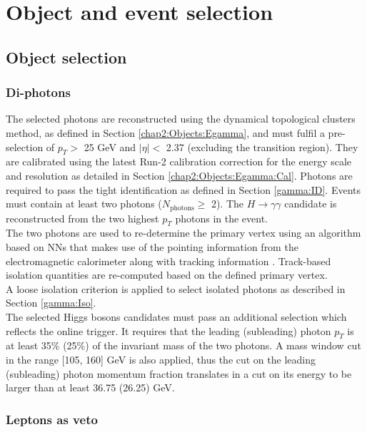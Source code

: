 \section{Object and event selection}
\label{HHyybb:ObjEvt}

\subsection{Object selection}
\label{HHyybb:ObjEvt:Obj}

\subsubsection{Di-photons}
\label{HHyybb:ObjEvt:Obj:gamma}
The selected photons are reconstructed using the dynamical topological clusters method, as defined in Section \ref{chap2:Objects:Egamma}, and must fulfil a pre-selection of $p_T > $ 25 GeV and $|\eta| < $ 2.37 (excluding the transition region). They are calibrated using the latest Run-2 calibration correction for the energy scale and resolution as detailed in Section \ref{chap2:Objects:Egamma:Cal}. Photons are required to pass the tight identification as defined in Section \ref{gamma:ID}. Events must contain at least two photons ($N_{\text{photons}} \geq $ 2). The $H\to\gamma\gamma$ candidate is reconstructed from the two highest $p_T$ photons in the event.\\ 
The two photons are used to re-determine the primary vertex using an algorithm based on NNs that makes use of the pointing information from the electromagnetic calorimeter along with tracking information \cite{DiPhotonVertex}. Track-based isolation quantities are re-computed based on the defined primary vertex. \\
A loose isolation criterion is applied to select isolated photons as described in Section \ref{gamma:Iso}.\\
The selected Higgs bosons candidates must pass an additional selection which reflects the online trigger. It requires that the leading (subleading) photon $p_T$ is at least 35\% (25\%) of the invariant mass of the two photons. A mass window cut in the range [105, 160] GeV is also applied, thus the cut on the leading (subleading) photon momentum fraction translates in a cut on its energy to be larger than at least 36.75 (26.25) GeV.

\subsubsection{Leptons as veto}
\label{HHyybb:ObjEvt:Obj:lepton}

